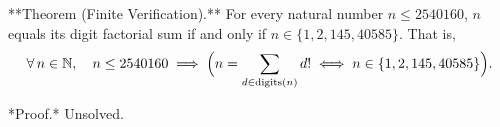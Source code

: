 
**Theorem (Finite Verification).** For every natural number $n \leq 2540160$, $n$ equals its digit factorial sum if and only if $n \in \{1, 2, 145, 40585\}$. That is,
$$\forall\, n \in \mathbb{N},\quad n \leq 2540160 \;\Longrightarrow\; \Bigl(n = \sum_{d \in \text{digits}(n)} d!\;\Longleftrightarrow\; n \in \{1, 2, 145, 40585\}\Bigr).$$

*Proof.* Unsolved.